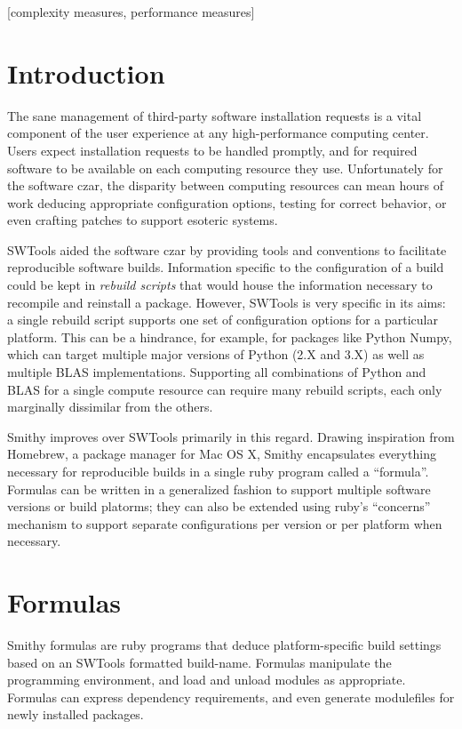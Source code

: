 \documentclass{acm_proc_article-sp}
\begin{document}
[complexity measures, performance measures]



\section{Introduction}
The sane management of third-party software installation requests is a vital
component of the user experience at any high-performance computing center. Users
expect installation requests to be handled promptly, and for required software
to be available on each computing resource they use. Unfortunately for the
software czar, the disparity between computing resources can mean hours of work
deducing appropriate configuration options, testing for correct behavior, or
even crafting patches to support esoteric systems.

SWTools\cite{Fahey} aided the software czar by providing tools and conventions
to facilitate reproducible software builds. Information specific to the
configuration of a build could be kept in \textit{rebuild scripts} that would
house the information necessary to recompile and reinstall a package.  However,
SWTools is very specific in its aims: a single rebuild script supports one set
of configuration options for a particular platform. This can be a hindrance, for
example, for packages like Python Numpy, which can target multiple major
versions of Python (2.X and 3.X) as well as multiple BLAS implementations.
Supporting all combinations of Python and BLAS for a single compute resource can
require many rebuild scripts, each only marginally dissimilar from the others.

Smithy improves over SWTools primarily in this regard. Drawing inspiration from
Homebrew\cite{Homebrew}, a package manager for Mac OS X, Smithy encapsulates
everything necessary for reproducible builds in a single ruby program called a
``formula''. Formulas can be written in a generalized fashion to support
multiple software versions or build platorms; they can also be extended using
ruby's ``concerns'' mechanism to support separate configurations per version or
per platform when necessary.

\section{Formulas}
Smithy formulas are ruby programs that deduce platform-specific build settings
based on an SWTools formatted build-name. Formulas manipulate the programming
environment, and load and unload modules as appropriate. Formulas can express
dependency requirements, and even generate modulefiles for newly installed
packages.
\end{document}
